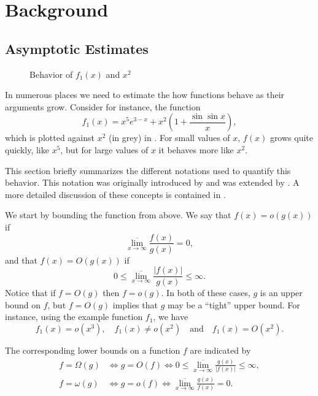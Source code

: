 \chapter{Background}
\label{Background:Chap}

\section{Asymptotic Estimates}
\label{Back:Asymp:Sec}

\begin{figure}
\begin{center}
\end{center}
\caption{Behavior of $f_1(x)$ and $x^2$\label{AsympFun:Fig}}
\end{figure}


In numerous places we need to estimate the how functions behave as
their arguments grow.  Consider for instance, the function
\[
f_1(x) = x^5 e^{3-x} + x^2 \left(1 + \frac{\sin \sin x}{x}\right),
\]
which is plotted against $x^2$ (in grey) in .
For small values of $x$, $f(x)$ grows quite quickly, like $x^5$, but
for large values of $x$ it behaves more like $x^2$.  

This section briefly summarizes the different notations used to
quantify this behavior.  This notation was originally introduced by
{\LandauE} \cite{Landau1974-cyn} and was extended by {\Knuth}
\cite{Knuth1976-qs}.  A more detailed discussion of these concepts is
contained in \cite{Cormen2014-py}.

We start by bounding the function from above.  We say that $f(x) =
o(g(x))$ if
\[
\overline{\lim_{x\rightarrow \infty}} \frac{f(x)}{g(x)} = 0,
\]
and that 
$f(x) = O(g(x))$ if 
\[
0 \le \overline{\lim_{x\rightarrow \infty}} \frac{|f(x)|}{g(x)} \le \infty.
\]
Notice that if $f = O(g)$ then $f = o(g)$.  In both of these cases,
$g$ is an upper bound on $f$, but $f=O(g)$ implies that $g$ may be a
``tight'' upper bound.  For instance, using the example function
$f_1$, we have
\[
f_1(x) = o(x^3), \quad f_1(x) \not= o(x^2) \quad\mbox{and}\quad
f_1(x) = O(x^2).
\]


The corresponding lower bounds on a function $f$ are indicated by 
\begin{equation}
\begin{split}
f = \Omega(g) &\Longleftrightarrow g = O(f)  \Longleftrightarrow 
0 \le \overline{\lim_{x\rightarrow \infty}} \frac{g(x)}{|f(x)|} \le \infty,\\
f = \omega(g) &\Longleftrightarrow g = o(f) \Longleftrightarrow 
\overline{\lim_{x\rightarrow \infty}} \frac{g(x)}{f(x)} = 0.
\end{split}
\end{equation}

